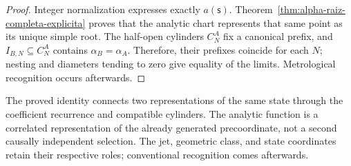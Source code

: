 \begin{proof}
Integer normalization expresses exactly \(a(\mathsf s)\).
Theorem~\ref{thm:alpha-raiz-completa-explicita} proves that the analytic
chart represents that same point as its unique simple root. The
half-open cylinders \(C_N^A\) fix a canonical prefix, and
\(I_{B,N}\subseteq C_N^A\) contains \(\alpha_B=\alpha_A\). Therefore, their
prefixes coincide for each \(N\); nesting and diameters tending to
zero give equality of the limits. Metrological
recognition occurs afterwards.
\end{proof}

The proved identity connects two representations of the same state
through the coefficient recurrence and compatible cylinders.
The analytic function is a correlated representation of the already
generated precoordinate, not a second causally independent selection.
The jet, geometric class, and state coordinates retain their respective
roles; conventional recognition comes afterwards.
